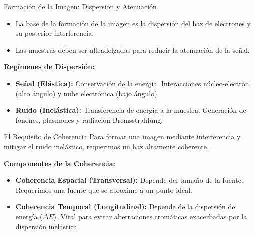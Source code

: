 \begin{frame}{Formación de la Imagen: Dispersión y Atenuación}
    \begin{itemize}
        \item La base de la formación de la imagen es la dispersión del haz de electrones y su posterior interferencia.
        \item Las muestras deben ser ultradelgadas para reducir la atenuación de la señal.
    \end{itemize}
    \vspace{0.5cm}
    \textbf{Regímenes de Dispersión:}
    \begin{itemize}
        \item \textbf{Señal (Elástica):} Conservación de la energía. Interacciones núcleo-electrón (alto ángulo) y nube electrónica (bajo ángulo).
        \item \textbf{Ruido (Inelástica):} Transferencia de energía a la muestra. Generación de fonones, plasmones y radiación Bremsstrahlung.
    \end{itemize}
\end{frame}

\begin{frame}{El Requisito de Coherencia}
    Para formar una imagen mediante interferencia y mitigar el ruido inelástico, requerimos un haz altamente coherente.
    
    \vspace{0.5cm}
    \textbf{Componentes de la Coherencia:}
    \begin{itemize}
        \item \textbf{Coherencia Espacial (Transversal):} Depende del tamaño de la fuente. Requerimos una fuente que se aproxime a un punto ideal.
        \item \textbf{Coherencia Temporal (Longitudinal):} Depende de la dispersión de energía ($\Delta E$). Vital para evitar aberraciones cromáticas exacerbadas por la dispersión inelástica.
    \end{itemize}
\end{frame}

